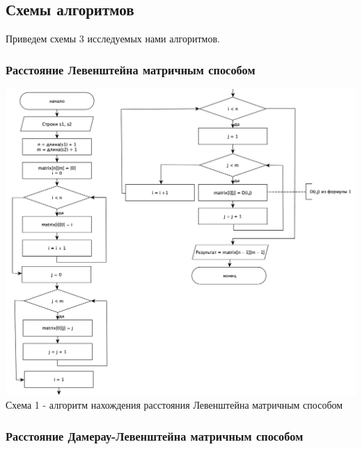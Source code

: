 \documentclass[a4paper,14pt]{article} %
\begin{document}
        \subsection{Схемы алгоритмов}
        Приведем схемы 3 исследуемых нами алгоритмов. 
        
        \subsubsection{Расстояние Левенштейна матричным способом}
        
        \begin{center}
        		\includegraphics[scale = 0.5]{shema1} \\ Схема  1 - алгоритм нахождения расстояния Левенштейна матричным способом
	\end{center}
	
        \subsubsection{Расстояние Дамерау-Левенштейна матричным способом}
        
\end{document}
